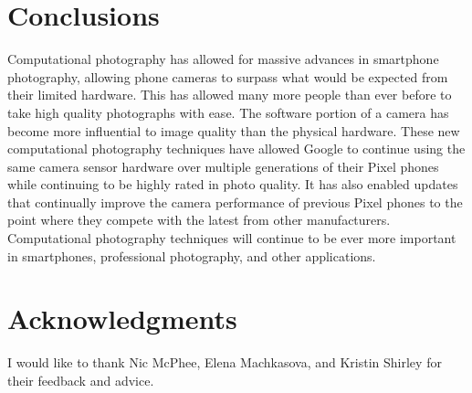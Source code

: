 \documentclass{sig-alternate}
\begin{document}
\section{Conclusions}

Computational photography has allowed for massive advances in smartphone photography, allowing phone cameras to surpass what would be expected from their limited hardware. This has allowed many more people than ever before to take high quality photographs with ease. 
The software portion of a camera has become more influential to image quality than the physical hardware.
These new computational photography techniques have allowed Google to continue using the same camera sensor hardware over multiple generations of their Pixel phones while continuing to be highly rated in photo quality. It has also enabled updates that continually improve the camera performance of previous Pixel phones to the point where they compete with the latest from other manufacturers. 
Computational photography techniques will continue to be ever more important in smartphones, professional photography, and other applications.

\section*{Acknowledgments}

I would like to thank Nic McPhee, Elena Machkasova, and Kristin Shirley for their feedback and advice.

\label{sec:acknowledgments}

\pagebreak


  
\end{document}
